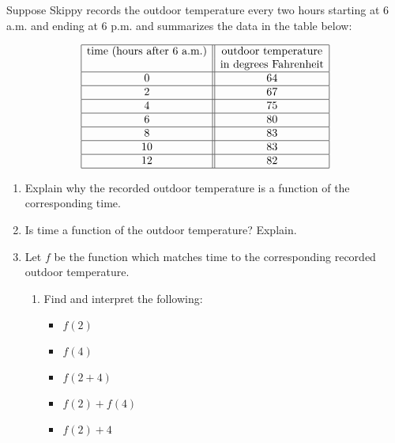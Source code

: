\documentclass{ximera}
\begin{document}
\begin{example}\label{timetempex1}   Suppose Skippy records the outdoor temperature every two hours starting at 6 a.m. and ending at 6 p.m. and summarizes the data in the table below:


\[\begin{array}{|c||c|}  \hline

  \text{time (hours after 6 a.m.)} &  \text{outdoor temperature} \\
	                               & \text{in degrees Fahrenheit} \\ \hline
 0 & 64  \\  \hline
 2 & 67  \\  \hline
 4 &  75  \\  \hline
 6 &  80 \\  \hline
 8 & 83  \\  \hline
 10 &  83 \\  \hline
 12 & 82  \\  \hline

\end{array}\]

\begin{enumerate}

\item  Explain why the recorded outdoor temperature is a function of the corresponding time. 

\item  Is time a function of the outdoor temperature?  Explain.

\item Let $f$ be the function which matches time to the corresponding recorded outdoor temperature.

\begin{enumerate}

\item  Find and interpret the following:



\begin{itemize}

\item  $f(2)$

\item  $f(4)$

\item  $f(2+4)$

\item  $f(2) + f(4)$

\item  $f(2) + 4$


\end{itemize}
\end{enumerate}
\end{enumerate}
\end{example}
\end{document}
